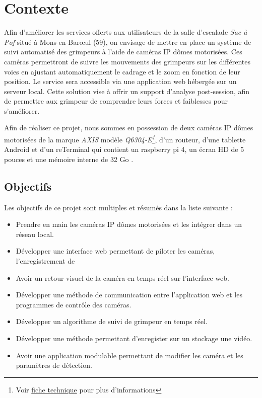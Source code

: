\documentclass[a4paper, 11pt, french]{article}
\newcounter{obj}
\begin{document}

\setcounter{secnumdepth}{3}
\setcounter{tocdepth}{3}
\startcontents[sections]

\tableofcontents
\newpage


\section{Contexte}
Afin d'améliorer les services offerts aux utilisateurs de la salle d’escalade \textit{Sac à Pof} situé à  Mons-en-Barœul (59), on envisage de mettre en place un système de suivi automatisé des grimpeurs à l'aide de caméras IP dômes motorisées. Ces caméras permettront de suivre les mouvements des grimpeurs sur les différentes voies en ajustant automatiquement le cadrage et le zoom en fonction de leur position. Le service sera accessible via une application web hébergée sur un serveur local. Cette solution vise à offrir un support d'analyse post-session, afin de permettre aux grimpeur de comprendre leurs forces et faiblesses pour s'améliorer.

Afin de réaliser ce projet, nous sommes en possession de deux caméras IP dômes motorisées de la marque \textit{AXIS} modèle \textit{Q6304-E\footnote{Voir \href{https://www.axis.com/dam/public/11/e4/20/cam\%C3\%A9ra-r\%C3\%A9seau-\%C3\%A0-d\%C3\%B4me-ptz-axis-q6034-e-fr-FR-201515.pdf}{fiche technique} pour plus d'informations}}, d'un routeur, d'une tablette Android et d'un reTerminal qui contient un raspberry pi 4, un écran HD de 5 pouces et une mémoire interne de 32 Go \cite{reTerminal}.

\subsection{Objectifs}
Les objectifs de ce projet sont multiples et  résumés dans la liste suivante :
\begin{itemize}
  \item Prendre en main les caméras IP dômes motorisées et les intégrer dans un réseau local.
  \item Développer une interface web permettant de piloter les caméras, l'enregistrement de  \item Avoir un retour visuel de la caméra en temps réel sur l'interface web.
  \item Développer une méthode de communication entre l'application web et les programmes de contrôle des caméras.
  \item Développer un algorithme de suivi de grimpeur en temps réel.
  \item Développer une méthode permettant d'enregister sur un stockage une vidéo.
  \item Avoir une application modulable permettant de modifier les caméra et les paramètres de détection.
\end{itemize}
\end{document}
